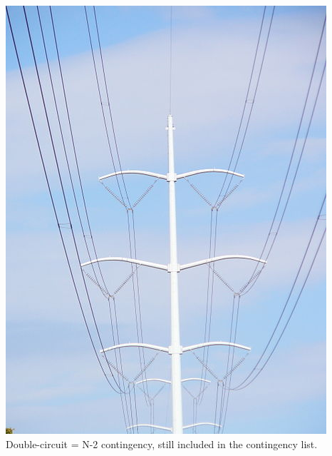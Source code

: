 \documentclass[compress]{beamer}
\begin{document}
\begin{frame}
\begin{columns}
\begin{column}{0.45\textwidth}
\includegraphics[width=\textwidth]{Figs/DoubleCircuit-3phase.JPG}\\
Double-circuit = N-2 contingency, still included in the contingency list.
\end{column}
  \end{columns}
\end{frame}
\end{document}
